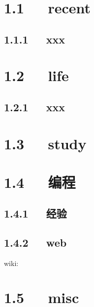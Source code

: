 \documentclass[letterpaper,12pt,english]{sphinxmanual}
\begin{document}
\section{1.1   recent}
\label{\detokenize{000misc/memo:recent}}

\subsection{1.1.1   xxx}
\label{\detokenize{000misc/memo:xxx}}

\section{1.2   life}
\label{\detokenize{000misc/memo:life}}

\subsection{1.2.1   xxx}
\label{\detokenize{000misc/memo:id2}}

\section{1.3   study}
\label{\detokenize{000misc/memo:study}}

\section{1.4   编程}
\label{\detokenize{000misc/memo:id3}}

\subsection{1.4.1   经验}
\label{\detokenize{000misc/memo:id4}}

\subsection{1.4.2   web}
\label{\detokenize{000misc/memo:web}}
wiki:





\section{1.5   misc}
\label{\detokenize{000misc/memo:misc}}
\end{document}
